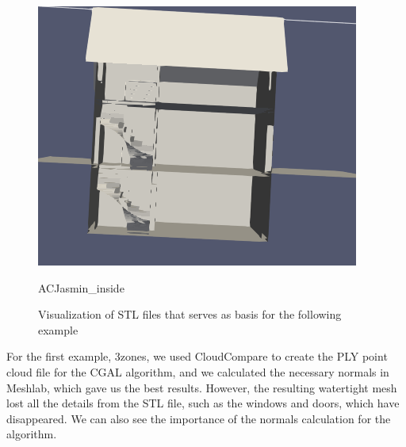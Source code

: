 \documentclass{article}
\begin{document}
\begin{figure}[H]
  \hspace{0.05\textwidth}
  \begin{minipage}[t]{0.27\textwidth}
    \includegraphics[width=\textwidth]{../../images/screen_kinetic/ACJasmin_inside.png}
    \caption*{ACJasmin\_inside}
  \end{minipage}
  \caption{Visualization of STL files that serves as basis for the following example}
\end{figure}  

For the first example, 3zones, 
we used CloudCompare to create the PLY point cloud file for the CGAL algorithm, 
and we calculated the necessary normals in Meshlab, which gave us the best results. 
However, the resulting watertight mesh lost all the details from the STL file,
such as the windows and doors, which have disappeared.
We can also see the importance of the normals calculation for the algorithm.
\end{document}
